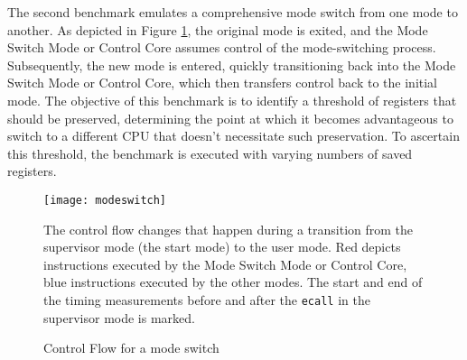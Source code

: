 The second benchmark emulates a comprehensive mode switch from one mode to
another. As depicted in Figure \ref{fig:modeswitch}, the original mode is exited, and the Mode
Switch Mode or Control Core assumes control of the mode-switching process.
Subsequently, the new mode is entered, quickly transitioning back into the Mode
Switch Mode or Control Core, which then transfers control back to the initial
mode. The objective of this benchmark is to identify a threshold of
registers that should be preserved, determining the point at which it becomes
advantageous to switch to a different CPU that doesn't necessitate such
preservation. To ascertain this threshold, the benchmark is executed with
varying numbers of saved registers.\par

\begin{figure}[h]
    \centering
    \texttt{[image: modeswitch]}
    \captionsetup{justification=centering}
    \caption{Control Flow for a mode switch}
            The control flow changes that happen during a transition from the
            supervisor mode (the start mode) to the user mode. Red depicts
            instructions executed by the Mode Switch Mode or Control Core, blue
            instructions executed by the other modes. The start and end of the
            timing measurements before and after the \texttt{ecall} in the supervisor
            mode is marked. 
    \label{fig:modeswitch}
\end{figure}

